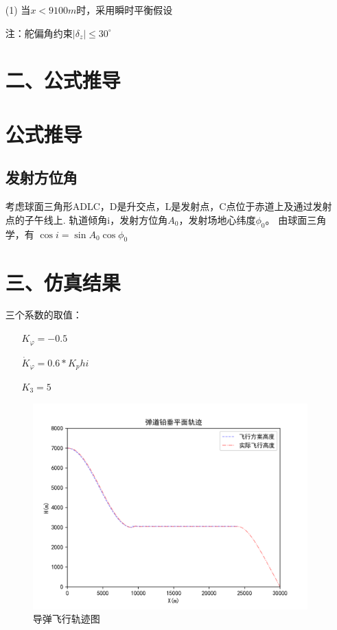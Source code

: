 \documentclass[UTF8]{ctexart}
\begin{document}
\begin{itemize}
    \item[(1)] 当$x<9100m$时，采用瞬时平衡假设
        
注：舵偏角约束$\left|\delta_{z} \right|\leq 30^{\circ}$




\section*{ 二、公式推导}



\section{公式推导}

\subsection{发射方位角}
考虑球面三角形ADLC，D是升交点，L是发射点，C点位于赤道上及通过发射点的子午线上.
轨道倾角i，发射方位角$A_0$，发射场地心纬度$\phi_0$。
由球面三角学，有
$\cos{i}=\sin{A_0}\cos{\phi_0}$

\section*{ 三、仿真结果}

    
三个系数的取值：
    \begin{itemize}
        \item[]$K_\varphi = - 0.5$
        \item[]$\dot{K}_\varphi= 0.6* K_phi$
        \item[]$K_3= 5$
    \end{itemize}



\begin{figure}[H]
    \centering
    \includegraphics[width=130mm]{img/飞行轨迹.png}
    \caption{导弹飞行轨迹图}
\end{figure}


\end{itemize}
\end{document}
